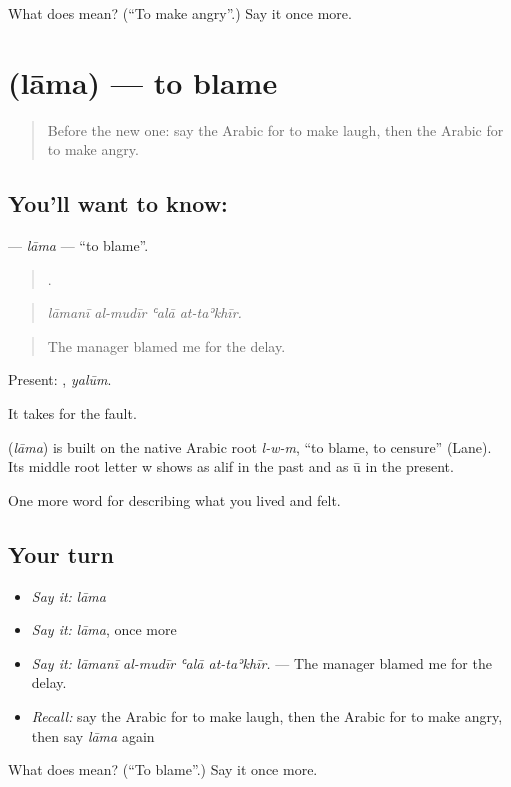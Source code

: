 \begin{tcolorbox}[breakable,colback=teal!4,colframe=teal!35!black,title={Before you move on}]
What does  mean? (\textquotedblleft{}To make angry\textquotedblright{}.) Say it once more.
\end{tcolorbox}
\section[\texorpdfstring{\ar{لام} (lāma)}{لام (lāma)}]{ (lāma) — to blame}

\label{lesson:AR-C498-lama}



\begin{quote}
Before the new one: say the Arabic for to make laugh, then the Arabic for to make angry.
\end{quote}

\subsection*{You'll want to know: }
\textbf{} — \emph{lāma} — \textquotedblleft{}to blame\textquotedblright{}.

\begin{quote}
   .
\end{quote}

\begin{quote}
\emph{lāmanī al-mudīr ʿalā at-taʾkhīr.}
\end{quote}

\begin{quote}
The manager blamed me for the delay.
\end{quote}

Present: , \emph{yalūm}.

It takes  for the fault.

\begin{cousinweb}
\textbf{} (\emph{lāma}) is built on the native Arabic root \emph{l-w-m}, \textquotedblleft{}to blame, to censure\textquotedblright{} (Lane). Its middle root letter w shows as alif in the past and as ū in the present.
\end{cousinweb}

\begin{grammarlens}[title={What you've built}]
One more word for describing what you lived and felt.
\end{grammarlens}

\subsection*{Your turn}
\begin{itemize}
\raggedright
  \item \emph{Say it:} \emph{lāma}
  \item \emph{Say it:} \emph{lāma}, once more
  \item \emph{Say it:} \emph{lāmanī al-mudīr ʿalā at-taʾkhīr.} — The manager blamed me for the delay.
  \item \emph{Recall:} say the Arabic for to make laugh, then the Arabic for to make angry, then say \emph{lāma} again
\end{itemize}

\begin{tcolorbox}[breakable,colback=teal!4,colframe=teal!35!black,title={Before you move on}]
What does  mean? (\textquotedblleft{}To blame\textquotedblright{}.) Say it once more.
\end{tcolorbox}
